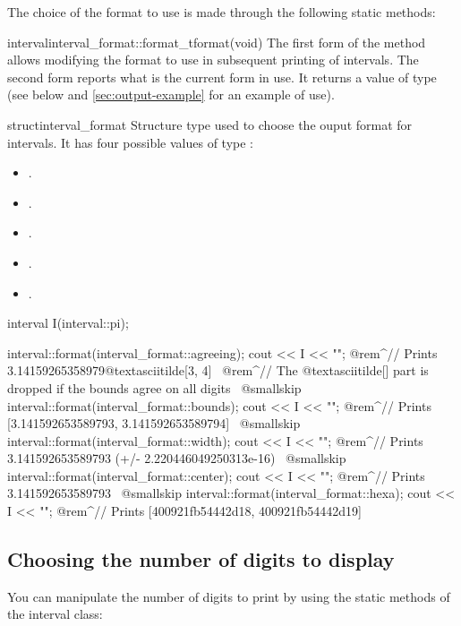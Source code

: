 \documentclass{manual}
\begin{document}
The choice of the format to use is made through the following static methods:

\begin{defstaticmethod}{interval}{interval\_format::format\_t}{format}{(void)}
  The first form of the method allows modifying the format to use in subsequent
  printing of intervals. The second form reports what is the current form in use.
  It returns a value of  type 
  (see below and \ref{sec:output-example} for an example of use).
\end{defstaticmethod}

\begin{deftype}{struct}{interval\_format}
  Structure type used to choose the ouput format for intervals. It has
  four possible values of type :
\begin{itemize}
\item {}.
\item {}.
\item {}.
\item {}.
\item {}.
\end{itemize}
\end{deftype}

\begin{example}
  interval I(interval::pi);

  interval::format(interval_format::agreeing);
  cout << I << "\n";
  @rem^// Prints 3.14159265358979@textasciitilde[3, 4]~
  @rem^// The @textasciitilde[] part is dropped if the bounds agree on all digits~
  @smallskip
  interval::format(interval_format::bounds);
  cout << I << "\n";
  @rem^// Prints [3.141592653589793, 3.141592653589794]~
  @smallskip
  interval::format(interval_format::width);
  cout << I << "\n";
  @rem^// Prints 3.141592653589793 (+/- 2.220446049250313e-16)~
  @smallskip
  interval::format(interval_format::center);
  cout << I << "\n";
  @rem^// Prints 3.141592653589793~
  @smallskip
  interval::format(interval_format::hexa);
  cout << I << "\n";
  @rem^// Prints [400921fb54442d18, 400921fb54442d19]~
\end{example}

\subsection{Choosing the number of digits to display}
You can manipulate the number of digits to print by using the  static
methods of the interval class:
\end{document}
